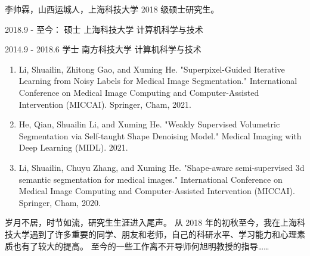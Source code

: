 \ifgraduate
\begin{resume}
李帅霖，山西运城人，上海科技大学 2018 级硕士研究生。
\end{resume}

\begin{education}
2018.9 - 至今：      硕士    上海科技大学    计算机科学与技术

2014.9 - 2018.6     学士    南方科技大学    计算机科学与技术
\end{education}

\begin{publications}
\begin{enumerate}
    \item Li, Shuailin, Zhitong Gao, and Xuming He. "Superpixel-Guided Iterative Learning from Noisy Labels for Medical Image Segmentation." International Conference on Medical Image Computing and Computer-Assisted Intervention (MICCAI). Springer, Cham, 2021.
    \item He, Qian, Shuailin Li, and Xuming He. "Weakly Supervised Volumetric Segmentation via Self-taught Shape Denoising Model." Medical Imaging with Deep Learning (MIDL). 2021.
    \item Li, Shuailin, Chuyu Zhang, and Xuming He. "Shape-aware semi-supervised 3d semantic segmentation for medical images." International Conference on Medical Image Computing and Computer-Assisted Intervention (MICCAI). Springer, Cham, 2020.
\end{enumerate}

\end{publications}

\begin{publications*}
\end{publications*}



\fi


\begin{acknowledgement}
岁月不居，时节如流，研究生生涯进入尾声。
从 2018 年的初秋至今，我在上海科技大学遇到了许多重要的同学、朋友和老师，自己的科研水平、学习能力和心理素质也有了较大的提高。
至今的一些工作离不开导师何旭明教授的指导……

\end{acknowledgement}